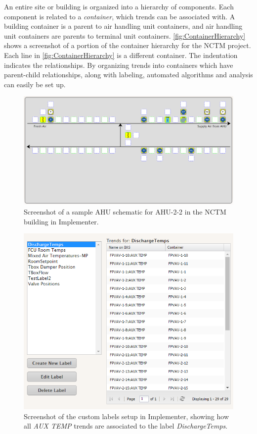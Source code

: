 An entire site or building is organized into a hierarchy of components.
Each component is related to a \textit{container}, which trends can be
associated with.  A building container is a parent to air handling unit
containers, and air handling unit containers are parents to terminal
unit containers.  \figref{} \ref{fig:ContainerHierarchy} shows a
screenshot of a portion of the container hierarchy for the NCTM project.
Each line in \figref{} \ref{fig:ContainerHierarchy} is a different
container. The indentation indicates the relationships. By organizing
trends into containers which have parent-child relationships, along with
labeling, automated algorithms and analysis can easily be set up.

\begin{figure}
\centering
\includegraphics[scale=0.5]{Images/SampleAHUSchematic.PNG}
\caption{Screenshot of a sample AHU schematic for AHU-2-2 in the NCTM building in Implementer.}
\label{fig:AHUSchematic}
\end{figure}

\begin{figure}
\centering
\includegraphics[scale=0.75]{Images/CustomLabels.PNG}
\caption{Screenshot of the custom labels setup in Implementer, showing how all \textit{AUX TEMP} trends are associated to the label \textit{DischargeTemps}. }
\label{fig:CustomLabels}
\end{figure}

